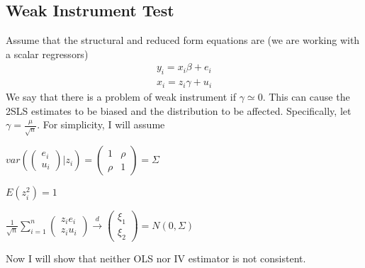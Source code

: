 \documentclass[12pt]{article}
\theoremstyle{definition}
\theoremstyle{property}
\theoremstyle{assumption}
\theoremstyle{example}
\theoremstyle{comment}
\begin{document}
\subsection{Weak Instrument Test}
Assume that the structural and reduced form equations are (we are working with a scalar regressors)
\begin{gather*}
y_i = x_i\beta+ e_i \\ x_i=z_i\gamma+u_i
\end{gather*}
We say that there is a problem of weak instrument if $\gamma\simeq0$. This can cause the 2SLS estimates to be biased and the distribution to be affected. Specifically, let $\gamma=\frac{\mu}{\sqrt{n}}$. For simplicity, I will assume
\begin{itemize}
\footnotesize{\item $var\left(\begin{pmatrix}e_i \\ u_i \end{pmatrix}| z_i\right)=\begin{pmatrix}1 & \rho \\ \rho &1\end{pmatrix}=\Sigma$
\item $E(z_i^2)=1$
\item $\frac{1}{\sqrt{n}}\sum_{i=1}^n\begin{pmatrix}z_ie_i \\ z_iu_i\end{pmatrix}\xrightarrow{d}\begin{pmatrix}\xi_1 \\ \xi_2\end{pmatrix}=N(0,\Sigma)$}\normalsize
\end{itemize}
Now I will show that neither OLS nor IV estimator is not consistent. 
\end{document}
